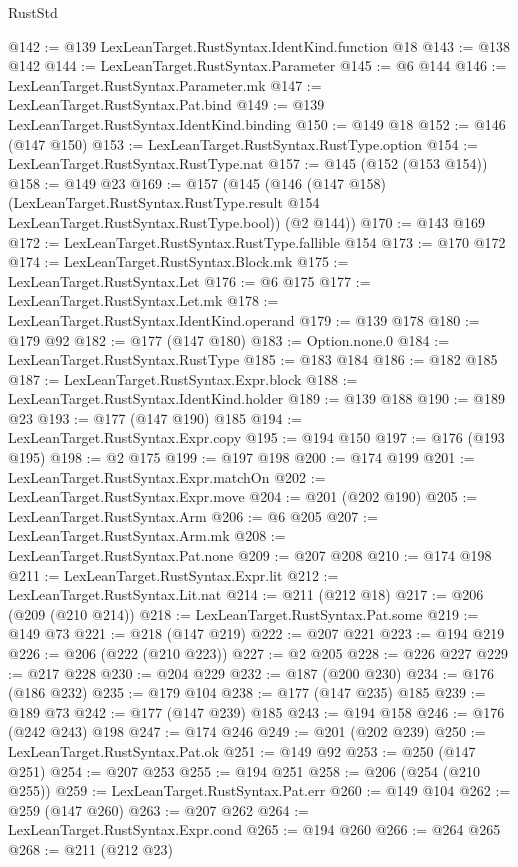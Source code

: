\begin{lexlean}{RustStd}
\begin{coremodule}
@142 := @139 LexLeanTarget.RustSyntax.IdentKind.function @18
@143 := @138 @142
@144 := LexLeanTarget.RustSyntax.Parameter
@145 := @6 @144
@146 := LexLeanTarget.RustSyntax.Parameter.mk
@147 := LexLeanTarget.RustSyntax.Pat.bind
@149 := @139 LexLeanTarget.RustSyntax.IdentKind.binding
@150 := @149 @18
@152 := @146 (@147 @150)
@153 := LexLeanTarget.RustSyntax.RustType.option
@154 := LexLeanTarget.RustSyntax.RustType.nat
@157 := @145 (@152 (@153 @154))
@158 := @149 @23
@169 := @157
    (@145
      (@146
        (@147 @158)
        (LexLeanTarget.RustSyntax.RustType.result @154 LexLeanTarget.RustSyntax.RustType.bool))
      (@2 @144))
@170 := @143 @169
@172 := LexLeanTarget.RustSyntax.RustType.fallible @154
@173 := @170 @172
@174 := LexLeanTarget.RustSyntax.Block.mk
@175 := LexLeanTarget.RustSyntax.Let
@176 := @6 @175
@177 := LexLeanTarget.RustSyntax.Let.mk
@178 := LexLeanTarget.RustSyntax.IdentKind.operand
@179 := @139 @178
@180 := @179 @92
@182 := @177 (@147 @180)
@183 := Option.none.{0}
@184 := LexLeanTarget.RustSyntax.RustType
@185 := @183 @184
@186 := @182 @185
@187 := LexLeanTarget.RustSyntax.Expr.block
@188 := LexLeanTarget.RustSyntax.IdentKind.holder
@189 := @139 @188
@190 := @189 @23
@193 := @177 (@147 @190) @185
@194 := LexLeanTarget.RustSyntax.Expr.copy
@195 := @194 @150
@197 := @176 (@193 @195)
@198 := @2 @175
@199 := @197 @198
@200 := @174 @199
@201 := LexLeanTarget.RustSyntax.Expr.matchOn
@202 := LexLeanTarget.RustSyntax.Expr.move
@204 := @201 (@202 @190)
@205 := LexLeanTarget.RustSyntax.Arm
@206 := @6 @205
@207 := LexLeanTarget.RustSyntax.Arm.mk
@208 := LexLeanTarget.RustSyntax.Pat.none
@209 := @207 @208
@210 := @174 @198
@211 := LexLeanTarget.RustSyntax.Expr.lit
@212 := LexLeanTarget.RustSyntax.Lit.nat
@214 := @211 (@212 @18)
@217 := @206 (@209 (@210 @214))
@218 := LexLeanTarget.RustSyntax.Pat.some
@219 := @149 @73
@221 := @218 (@147 @219)
@222 := @207 @221
@223 := @194 @219
@226 := @206 (@222 (@210 @223))
@227 := @2 @205
@228 := @226 @227
@229 := @217 @228
@230 := @204 @229
@232 := @187 (@200 @230)
@234 := @176 (@186 @232)
@235 := @179 @104
@238 := @177 (@147 @235) @185
@239 := @189 @73
@242 := @177 (@147 @239) @185
@243 := @194 @158
@246 := @176 (@242 @243) @198
@247 := @174 @246
@249 := @201 (@202 @239)
@250 := LexLeanTarget.RustSyntax.Pat.ok
@251 := @149 @92
@253 := @250 (@147 @251)
@254 := @207 @253
@255 := @194 @251
@258 := @206 (@254 (@210 @255))
@259 := LexLeanTarget.RustSyntax.Pat.err
@260 := @149 @104
@262 := @259 (@147 @260)
@263 := @207 @262
@264 := LexLeanTarget.RustSyntax.Expr.cond
@265 := @194 @260
@266 := @264 @265
@268 := @211 (@212 @23)

\end{coremodule}
\end{lexlean}
